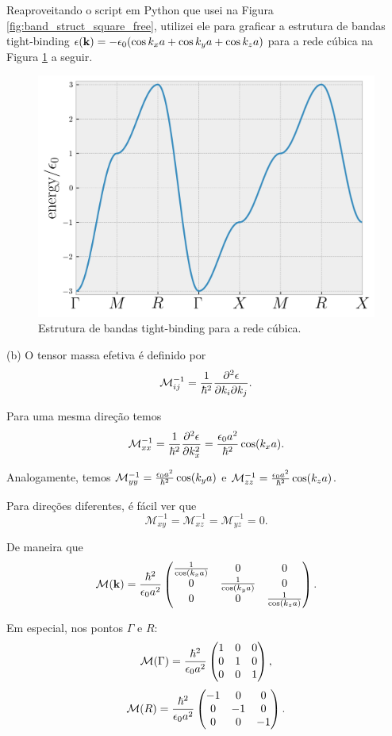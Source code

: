 \documentclass[a4paper,10pt]{article}
\begin{document}
Reaproveitando o script em Python que usei na Figura \ref{fig:band_struct_square_free}, utilizei ele para graficar a estrutura de bandas tight-binding $\epsilon({\vb{k}}) = -\epsilon_0 (\cos k_x a + \cos k_y a + \cos k_z a)$ para a rede cúbica na Figura \ref{fig:band_struct_cubic_free} a seguir.
\begin{figure}[H]
\centering
\includegraphics[width=0.5\linewidth]{fig/band_struct_cubic_free.png}
\caption{Estrutura de bandas tight-binding para a rede cúbica.}
\label{fig:band_struct_cubic_free}
\end{figure}

(b) O tensor massa efetiva é definido por
$$
\mathcal{M}^{-1}_{ij} = \frac{1}{\hbar^2} \pdv{\epsilon}{k_i}{k_j}.
$$

Para uma mesma direção temos
$$
\mathcal{M}_{xx}^{-1} = \frac{1}{\hbar^2} \pdv[2]{\epsilon}{k_x} = \frac{\epsilon_0 a^2}{\hbar^2} \cos(k_x a).
$$

Analogamente, temos $\mathcal{M}_{yy}^{-1} = \frac{\epsilon_0 a^2}{\hbar^2} \cos(k_y a)$ e $\mathcal{M}_{zz}^{-1} = \frac{\epsilon_0 a^2}{\hbar^2} \cos(k_z a)$.

\n\n

Para direções diferentes, é fácil ver que
$$
\mathcal{M}_{xy}^{-1} = \mathcal{M}_{xz}^{-1} = \mathcal{M}_{yz}^{-1} = 0.
$$

De maneira que
$$
\mathcal{M}({\vb{k}}) =
\frac{\hbar^2}{\epsilon_0 a^2}
\begin{pmatrix}
\frac{1}{\cos(k_x a)} & 0 & 0 \\
0 & \frac{1}{\cos(k_y a)} & 0 \\
0 & 0 & \frac{1}{\cos(k_z a)} \\
\end{pmatrix}.
$$

Em especial, nos pontos $\Gamma$ e $R$:
$$
\mathcal{M}(\Gamma) =
\frac{\hbar^2}{\epsilon_0 a^2}
\begin{pmatrix}
1 & 0 & 0 \\
0 & 1 & 0 \\
0 & 0 & 1 \\
\end{pmatrix},
$$
$$
\mathcal{M}(R) =
\frac{\hbar^2}{\epsilon_0 a^2}
\begin{pmatrix}
-1 & 0 & 0 \\
0 & -1 & 0 \\
0 & 0 & -1 \\
\end{pmatrix}.
$$
\end{document}
